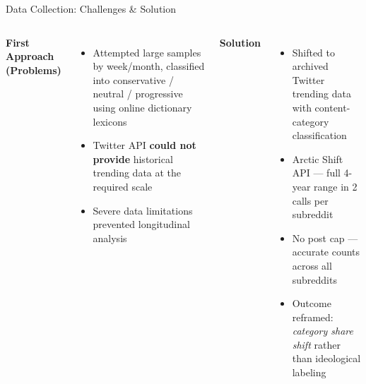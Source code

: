 \documentclass[aspectratio=169]{beamer}
\begin{document}
\begin{frame}{Data Collection: Challenges \& Solution}
\begin{columns}[t]
    \textbf{\textcolor{red!70!black}{First Approach (Problems)}}
    \begin{itemize}
        \item Attempted large samples by week/month, classified into conservative / neutral / progressive using online dictionary lexicons
        \item Twitter API \textbf{could not provide} historical trending data at the required scale
        \item Severe data limitations prevented longitudinal analysis
    \end{itemize}

    \textbf{\textcolor{utepblue}{Solution}}
    \begin{itemize}
        \item Shifted to archived Twitter trending data with content-category classification
        \item Arctic Shift API --- full 4-year range in 2 calls per subreddit
        \item No post cap --- accurate counts across all subreddits
        \item Outcome reframed: \textit{category share shift} rather than ideological labeling
    \end{itemize}
\end{columns}
\end{frame}
\end{document}
